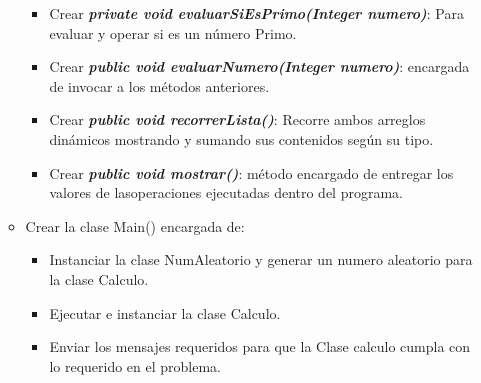 \documentclass{exam}
\begin{document}
\begin{questions}
\begin{enumerate}
\begin{itemize}
\begin{itemize}
      \item Crear \textit{\textbf{private void evaluarSiEsPrimo(Integer numero)}}: Para evaluar y operar si es un n\'umero Primo.
      \item Crear \textit{\textbf{public void evaluarNumero(Integer numero)}}: encargada de invocar a los m\'etodos anteriores.
      \item Crear \textit{\textbf{public void recorrerLista()}}: Recorre ambos arreglos din\'amicos mostrando y sumando sus contenidos seg\'un su tipo.
      \item Crear \textit{\textbf{public void mostrar()}}: m\'etodo encargado de entregar los valores de lasoperaciones ejecutadas dentro del programa.
    \end{itemize}
    \item Crear la clase Main() encargada de:
      \begin{itemize}
        \item Instanciar la clase NumAleatorio y generar un numero aleatorio para la clase Calculo.
        \item Ejecutar e instanciar la clase Calculo.
        \item Enviar los mensajes requeridos para que la Clase calculo cumpla con lo requerido en el problema.
      \end{itemize}

  \end{itemize}
  \end{enumerate}

\end{questions}
\end{document}
